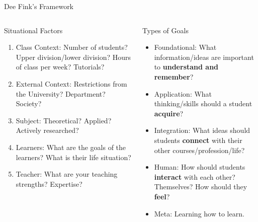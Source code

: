 \documentclass[10pt, aspectratio=169, t]{beamer}
\begin{document}
\begin{frame}{Dee Fink's Framework}
	\vspace{-.5cm}
\begin{columns}
\begin{column}{0.5\textwidth}
	\begin{block}{Situational Factors}
		\begin{enumerate}
			\item \alert{Class Context}: Number of students? Upper division/lower division?
				Hours of class per week? Tutorials?
			
			\item \alert{External Context}: Restrictions from the University? Department? Society?

			\item \alert{Subject}: Theoretical? Applied? Actively researched?
			
			\item \alert{Learners}: What are the goals of the learners? What is their life situation?

			\item \alert{Teacher}: What are your teaching strengths? Expertise?

			
		\end{enumerate}
	\end{block}
\end{column}
\begin{column}{0.5\textwidth}  %
	\begin{block}{Types of Goals}
		\begin{itemize}
			\item \alert{Foundational}: What information/ideas are important to \textbf{understand and remember}? 
			\item \alert{Application}: What thinking/skills should a student \textbf{acquire}? 
			\item \alert{Integration}: What ideas should students \textbf{connect} with their other courses/profession/life?
			\item \alert{Human}: How should students \textbf{interact} with each other? Themselves? How should they \textbf{feel}? 
			\item \alert{Meta}: Learning how to learn. 
		\end{itemize}
	\end{block}
\end{column}
\end{columns}
\end{frame}
\end{document}
